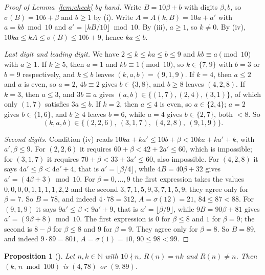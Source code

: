\documentclass[11pt]{amsart}
\theoremstyle{plain}
\newtheorem{proposition}[theorem]{Proposition}
\theoremstyle{definition}
\newcommand{\N}{\mathbb{N}}
\newcommand{\sw}{\sigma}
\begin{document}
\begin{proof}[Proof of Lemma~\ref{lem:check} by hand]
Write $B=10\beta+b$ with digits $\beta,b$, so $\sw(B)=10b+\beta$ and $b\ge1$ by (i). Write $A=A(k,B)=10a+a'$ with $a=kb\bmod10$ and $a'=\lfloor kB/10\rfloor\bmod10$. By (iii), $a\ge1$, so $k\ne0$. By (iv), $10ka\le kA\le\sw(B)\le10b+9$, hence $ka\le b$.

\emph{Last digit and leading digit.} We have $2\le k\le ka\le b\le9$ and $kb\equiv a\pmod{10}$ with $a\ge1$. If $k\ge5$, then $a=1$ and $kb\equiv1\pmod{10}$, so $k\in\{7,9\}$ with $b=3$ or $b=9$ respectively, and $k\le b$ leaves $(k,a,b)=(9,1,9)$. If $k=4$, then $a\le2$ and $a$ is even, so $a=2$, $4b\equiv2$ gives $b\in\{3,8\}$, and $b\ge8$ leaves $(4,2,8)$. If $k=3$, then $a\le3$, and $3b\equiv a$ gives $(a,b)\in\{(1,7),(2,4),(3,1)\}$, of which only $(1,7)$ satisfies $3a\le b$. If $k=2$, then $a\le4$ is even, so $a\in\{2,4\}$; $a=2$ gives $b\in\{1,6\}$, and $b\ge4$ leaves $b=6$, while $a=4$ gives $b\in\{2,7\}$, both $<8$. So
\[
  (k,a,b)\in\{(2,2,6),\ (3,1,7),\ (4,2,8),\ (9,1,9)\}.
\]

\emph{Second digits.} Condition (iv) reads $10ka+ka'\le10b+\beta<10ka+ka'+k$, with $a',\beta\le9$.
For $(2,2,6)$ it requires $60+\beta<42+2a'\le60$, which is impossible; for $(3,1,7)$ it requires $70+\beta<33+3a'\le60$, also impossible.
For $(4,2,8)$ it says $4a'\le\beta<4a'+4$, that is $a'=\lfloor\beta/4\rfloor$, while $4B=40\beta+32$ gives $a'=(4\beta+3)\bmod10$. For $\beta=0,\dots,9$ the first expression takes the values $0,0,0,0,1,1,1,1,2,2$ and the second $3,7,1,5,9,3,7,1,5,9$; they agree only for $\beta=7$. So $B=78$, and indeed $4\cdot78=312$, $A=\sw(12)=21$, $84\le87<88$.
For $(9,1,9)$ it says $9a'\le\beta<9a'+9$, that is $a'=\lfloor\beta/9\rfloor$, while $9B=90\beta+81$ gives $a'=(9\beta+8)\bmod10$. The first expression is $0$ for $\beta\le8$ and $1$ for $\beta=9$; the second is $8-\beta$ for $\beta\le8$ and $9$ for $\beta=9$. They agree only for $\beta=8$. So $B=89$, and indeed $9\cdot89=801$, $A=\sw(1)=10$, $90\le98<99$.
\end{proof}

\begin{proposition}[]\label{prop:fwd}
Let $n,k\in\N$ with $10\nmid n$, $R(n)=nk$ and $R(n)\ne n$. Then $(k,\,n\bmod100)$ is $(4,78)$ or $(9,89)$.
\end{proposition}
\end{document}
